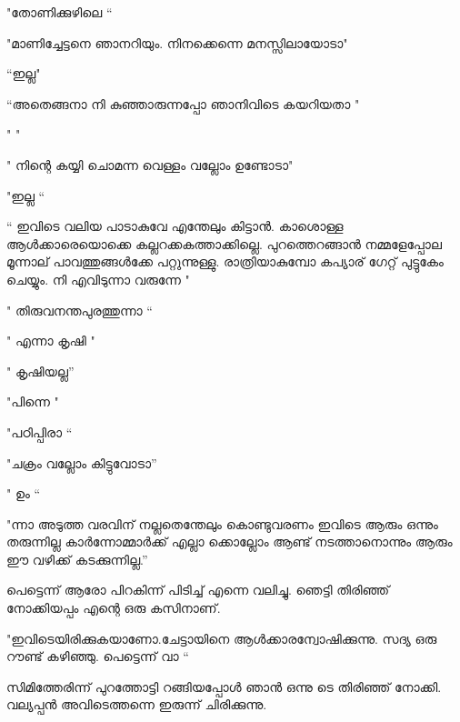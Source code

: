 \documentclass[10pt,a4paper]{report}
\begin{document}
    "തോണിക്കുഴിലെ “ 
    
    "മാണിച്ചേട്ടനെ ഞാനറിയും. നിനക്കെന്നെ മനസ്സിലായോടാ" 
    
    “ഇല്ല" 
    
    “അതെങ്ങനാ നി കുഞ്ഞാരുന്നപ്പോ ഞാനിവിടെ കയറിയതാ "
    
     " " 
     
     " നിന്റെ കയ്യി ചൊമന്ന വെള്ളം വല്ലോം ഉണ്ടോടാ" 
     
     "ഇല്ല “
     
      “ ഇവിടെ വലിയ പാടാകുവേ എന്തേലും കിട്ടാൻ. കാശൊള്ള ആൾക്കാരെയൊക്കെ കല്ലറക്കകത്താക്കില്ലെ. പുറത്തെറങ്ങാൻ നമ്മളേപ്പോല മൂന്നാല് പാവത്തുങ്ങൾക്കേ പറ്റുന്നുള്ളു. രാത്രിയാകുമ്പോ കപ്യാര് ഗേറ്റ് പുട്ടുകേം ചെയ്യും. നി എവിടുന്നാ വരുന്നേ " 
      
      " തിരുവനന്തപുരത്തുന്നാ “ 
      
      " എന്നാ കൃഷി " 
      
      " കൃഷിയല്ല” 
      
      "പിന്നെ "
      
       "പഠിപ്പിരാ “
      
       "ചക്രം വല്ലോം കിട്ടുവോടാ” 
       
       " ഉം “ 
       
       "ന്നാ അടുത്ത വരവിന് നല്ലതെന്തേലും കൊണ്ടുവരണം ഇവിടെ ആരും ഒന്നും തരുന്നില്ല കാർന്നോമ്മാർക്ക് എല്ലാ ക്കൊല്ലോം ആണ്ട് നടത്താനൊന്നും ആരും ഈ വഴിക്ക് കടക്കുന്നില്ല.” 
       
       പെട്ടെന്ന് ആരോ പിറകിന്ന് പിടിച്ച് എന്നെ വലിച്ചു. ഞെട്ടി തിരിഞ്ഞ് നോക്കിയപ്പം എന്റെ ഒരു കസിനാണ്.
       
        "ഇവിടെയിരിക്കുകയാണോ.ചേട്ടായിനെ ആൾക്കാരന്വോഷിക്കുന്നു. സദ്യ ഒരു റൗണ്ട് കഴിഞ്ഞു. പെട്ടെന്ന് വാ “ 
        
        സിമിത്തേരിന്ന് പുറത്തോട്ടി റങ്ങിയപ്പോൾ ഞാൻ ഒന്നു ടെ തിരിഞ്ഞ് നോക്കി. വല്യപ്പൻ അവിടെത്തന്നെ ഇരുന്ന് ചിരിക്കുന്നു.
\end{document}
